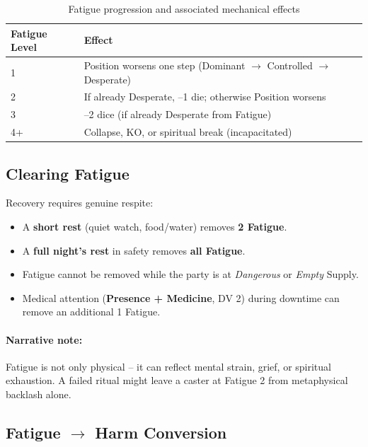 \begin{table}[htbp]
\centering
\small
\begin{tabularx}{\linewidth}{lX}
\toprule
\textbf{Fatigue Level} & \textbf{Effect} \\
\midrule
1 & Position worsens one step (Dominant $\rightarrow$ Controlled $\rightarrow$ Desperate) \\
2 & If already Desperate, --1 die; otherwise Position worsens \\
3 & --2 dice (if already Desperate from Fatigue) \\
4+ & Collapse, KO, or spiritual break (incapacitated) \\
\bottomrule
\end{tabularx}
\caption{Fatigue progression and associated mechanical effects}
\label{tab:fatigue-effects}
\end{table}

\subsection{Clearing Fatigue}
\label{subsec:fatigue-clear}

Recovery requires genuine respite:
\begin{itemize}
  \item A \textbf{short rest} (quiet watch, food/water) removes \textbf{2 Fatigue}.
  \item A \textbf{full night's rest} in safety removes \textbf{all Fatigue}.
  \item Fatigue cannot be removed while the party is at \textit{Dangerous} or \textit{Empty} Supply.
  \item Medical attention (\textbf{Presence + Medicine}, DV 2) during downtime can remove an additional 1 Fatigue.
\end{itemize}

\paragraph{Narrative note:}
Fatigue is not only physical -- it can reflect mental strain, grief, or spiritual exhaustion. A failed ritual might leave a caster at Fatigue 2 from metaphysical backlash alone.

\subsection{Fatigue $\rightarrow$ Harm Conversion}
\label{subsec:fatigue-harm}

